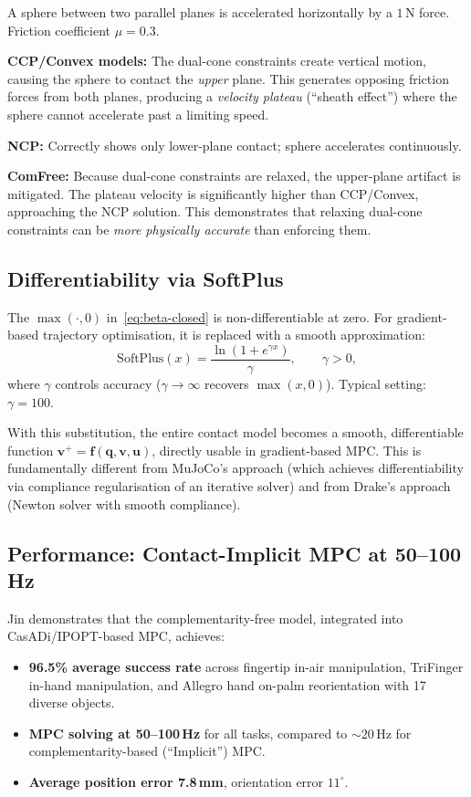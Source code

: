 \documentclass[11pt,twoside]{report}
\theoremstyle{definition}
\theoremstyle{plain}
\theoremstyle{remark}
\newcommand{\uu}{\bm{u}}
\newcommand{\q}{\bm{q}}
\newcommand{\0}{\bm{0}}
\begin{document}
\begin{examplebox}
A sphere between two parallel planes is accelerated horizontally by
a $1$\,N force.  Friction coefficient $\mu=0.3$.

\textbf{CCP/Convex models:} The dual-cone constraints create vertical motion,
causing the sphere to contact the \emph{upper} plane.  This generates
opposing friction forces from both planes, producing a \emph{velocity plateau}
(``sheath effect'') where the sphere cannot accelerate past a limiting speed.

\textbf{NCP:} Correctly shows only lower-plane contact; sphere accelerates
continuously.

\textbf{ComFree:} Because dual-cone constraints are relaxed, the upper-plane
artifact is mitigated.  The plateau velocity is significantly higher than
CCP/Convex, approaching the NCP solution.
This demonstrates that relaxing dual-cone constraints can be
\emph{more physically accurate} than enforcing them.
\end{examplebox}

\subsection{Differentiability via SoftPlus}

The $\max(\cdot,0)$ in~\eqref{eq:beta-closed} is non-differentiable at zero.
For gradient-based trajectory optimisation, it is replaced with a smooth approximation:
\begin{equation}
\text{SoftPlus}(x)=\frac{\ln(1+e^{\gamma x})}{\gamma},\qquad\gamma>0,
\end{equation}
where $\gamma$ controls accuracy ($\gamma\to\infty$ recovers $\max(x,0)$).
Typical setting: $\gamma=100$.

With this substitution, the entire contact model becomes a smooth, differentiable
function $\bm{v}^{+}=\bm{f}(\q,\bm{v},\uu)$, directly usable in gradient-based MPC.
This is fundamentally different from MuJoCo's approach (which achieves differentiability
via compliance regularisation of an iterative solver) and from Drake's approach
(Newton solver with smooth compliance).

\subsection{Performance: Contact-Implicit MPC at 50--100 Hz}

Jin demonstrates that the complementarity-free model, integrated into
CasADi/IPOPT-based MPC, achieves:
\begin{itemize}
\item \textbf{96.5\% average success rate} across fingertip in-air manipulation,
      TriFinger in-hand manipulation, and Allegro hand on-palm reorientation
      with 17 diverse objects.
\item \textbf{MPC solving at 50--100\,Hz} for all tasks, compared to
      ${\sim}20$\,Hz for complementarity-based (``Implicit'') MPC.
\item \textbf{Average position error 7.8\,mm}, orientation error $11^{\circ}$.
\end{itemize}
\end{document}
